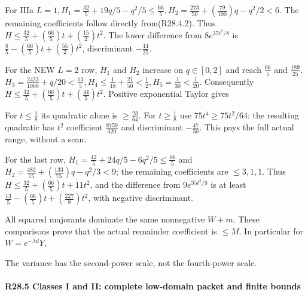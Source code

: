 For IIIa \(L=1,\allowbreak \allowbreak H_{1}=\frac{32}{5}+19q/5-q^2/5\le \frac{66}{5},\allowbreak \allowbreak  H_{2}=\frac{273}{50}+(\frac{79}{100})q-q^2/2<6\). The remaining coefficients follow directly from(R28.4.2). Thus \(H\le \frac{32}{5}+(\frac{66}{5})t+(\frac{15}{2})t^2\). The lower difference from \(8e^{35t^2/8}\) is \(\frac{8}{5}-(\frac{66}{5})t+(\frac{55}{2})t^2\), discriminant \(-\frac{44}{25}\).

For the NEW \(L=2\) row, \(H_{1}\) and \(H_{2}\) increase on \(q\in  [0,\allowbreak \allowbreak 2]\) and reach \(\frac{66}{5}\) and \(\frac{189}{25}\). \(H_{3}=\frac{2423}{1000}+q/20<\frac{13}{5},\allowbreak \allowbreak H_{4}\le \frac{1}{18}+\frac{21}{50}<\frac{1}{2},\allowbreak \allowbreak H_{5}=\frac{1}{30}<\frac{1}{20}\). Consequently \(H\le \frac{32}{5}+(\frac{66}{5})t+(\frac{44}{5})t^2\). Positive exponential Taylor gives


For \(t\le \frac{1}{8}\) its quadratic alone is \(\ge \frac{23}{64}\). For \(t\ge \frac{1}{8}\) use \(75t^4\ge 75t^2/64\): the resulting quadratic has \(t^2\) coefficient \(\frac{8759}{320}\) and discriminant \(-\frac{47}{50}\). This pays the full actual range, without a scan.

For the last row, \(H_{1}=\frac{42}{5}+24q/5-6q^2/5\le \frac{66}{5}\) and \(H_{2}=\frac{482}{75}+(\frac{133}{75})q-q^2/3<9\); the remaining coefficients are \(\le 3,\allowbreak \allowbreak 1,\allowbreak \allowbreak 1\). Thus \(H\le \frac{32}{5}+(\frac{66}{5})t+11t^2\), and the difference from \(9e^{35t^2/8}\) is at least \(\frac{13}{5}-(\frac{66}{5})t+(\frac{227}{8})t^2\), with negative discriminant.

All squared majorants dominate the same nonnegative \(W+m\). These comparisons prove that the actual remainder coefficient is \(\le M\). In particular for \(W=e^{-\lambda d} Y\),


The variance has the second-power scale, not the fourth-power scale.

\paragraph{R28.5 Classes I and II: complete low-domain packet and finite bounds}

